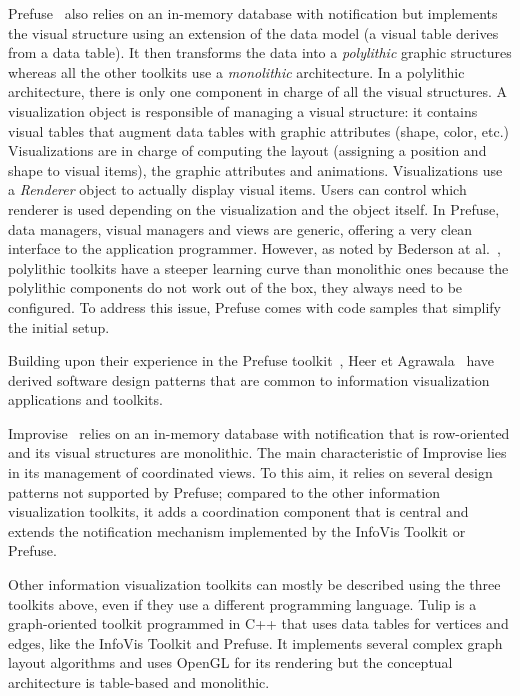 Prefuse~\cite{Prefuse} also relies on an in-memory database with
notification but implements the visual structure using an extension of
the data model (a visual table derives from a data table).  It then
transforms the data into a \emph{polylithic} graphic structures
whereas all the other toolkits use a \emph{monolithic} architecture.
In a polylithic architecture, there is only one component in charge of
all the visual structures.  A visualization object is responsible of
managing a visual structure: it contains visual tables that augment
data tables with graphic attributes (shape, color, etc.)
Visualizations are in charge of computing the layout (assigning a
position and shape to visual items), the graphic attributes and
animations.  Visualizations use a \emph{Renderer} object to actually
display visual items.  Users can control which renderer is used
depending on the visualization and the object itself.  In Prefuse,
data managers, visual managers and views are generic, offering a very
clean interface to the application programmer.  However, as noted by
Bederson at al.~\cite{Polylithic}, polylithic toolkits have a steeper
learning curve than monolithic ones because the polylithic components
do not work out of the box, they always need to be configured.  To
address this issue, Prefuse comes with code samples that simplify the
initial setup.

Building upon their experience in the Prefuse toolkit~\cite{Prefuse},
Heer et Agrawala~\cite{DesignPatternsIV} have derived software design
patterns that are common to information visualization applications and
toolkits. 

Improvise~\cite{Improvise} relies on an in-memory database with
notification that is row-oriented and its visual structures are
monolithic.  The main characteristic of Improvise lies in its
management of coordinated views.  To this aim, it relies on several
design patterns not supported by Prefuse; compared to the other
information visualization toolkits, it adds a coordination component
that is central and extends the notification mechanism implemented
by the InfoVis Toolkit or Prefuse.

Other information visualization toolkits can mostly be described using
the three toolkits above, even if they use a different programming
language.  Tulip is a graph-oriented toolkit programmed in C++ that
uses data tables for vertices and edges, like the InfoVis Toolkit and
Prefuse.  It implements several complex graph layout algorithms and
uses OpenGL for its rendering but the conceptual architecture is
table-based and monolithic.

